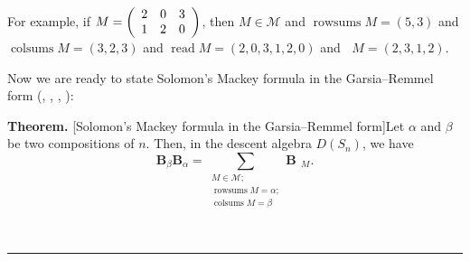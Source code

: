 \documentclass[12pt]{article}
\theoremstyle{definition}%
\newtheorem{thm}{Theorem}[section]
\theoremstyle{definition}%
\theoremstyle{remark}%
\newcommand{\BB}{\mathbf{B}}
\newcommand{\CM}{\mathcal{M}}
\newcommand{\rowsums}{\operatorname{rowsums}}
\newcommand{\colsums}{\operatorname{colsums}}
\newcommand{\readw}{\operatorname{read}}
\newcommand{\readb}{\mathop{\overline{\operatorname{read}}}}
\newenvironment{thm}[1][Theorem]{\noindent\textbf{#1.} }{\ \rule{0.5em}{0.5em}}
\begin{document}
For example, if $M=\left(
\begin{array}[c]{ccc}
2 & 0 & 3\\
1 & 2 & 0
\end{array}
\right)  $, then $M\in\CM$ and $\rowsums M=\left(
5,3\right)  $ and $\colsums M=\left(  3,2,3\right)  $ and
$\readw M=\left(  2,0,3,1,2,0\right)  $ and $\readb M
=\left(  2,3,1,2\right)  $.

Now we are ready to state Solomon's Mackey formula in the Garsia--Remmel form
(\cite[Proposition 1.1]{GarReu89}, \cite[Corollary 2.4]{Saliola},
\cite[Proposition 4.3]{BleLau92}, \cite[Theorem 2]{Willigenburg98}):

\begin{thm}
[Solomon's Mackey formula in the Garsia--Remmel form]\label{thm.smf}Let
$\alpha$ and $\beta$ be two compositions of $n$. Then, in the descent algebra
$D\left(  S_{n}\right)  $, we have
\[
\BB_{\beta}\BB_{\alpha}
= \sum_{\substack{M\in\CM;\\ \rowsums M=\alpha;
\\\colsums M=\beta}} \BB_{\readb M}.
\]

\end{thm}
\end{document}
